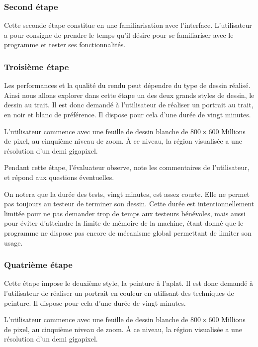 			\subsubsection{Second étape}
			Cette seconde étape constitue en une familiarisation avec l'interface. L'utilisateur
			a pour consigne de prendre le temps qu'il désire pour se familiariser avec le programme
			et tester ses fonctionnalités. 

			\subsubsection{Troisième étape}
			Les performances et la qualité du rendu peut dépendre du type de dessin réalisé. Ainsi
			nous allons explorer dans cette étape un des deux grands styles de dessin, le dessin au trait.
			Il est donc demandé à l'utilisateur de réaliser un portrait au trait, en noir et blanc de préférence.
			Il dispose pour cela d'une durée de vingt minutes. 


			L'utilisateur commence avec une feuille de dessin blanche de $800 \times 600$ Millions de pixel, au cinquième
			niveau de zoom. À ce niveau, la région visualisée a une résolution d'un demi gigapixel.

			Pendant cette étape, l'évaluateur observe, note les commentaires de l'utilisateur, et répond aux questions
			éventuelles. 

			On notera que la durée des tests, vingt minutes, est assez courte. Elle ne permet pas toujours au testeur
			de terminer son dessin. Cette durée est intentionnellement limitée pour ne pas demander trop de temps aux testeurs
			bénévoles, mais aussi pour éviter d'atteindre la limite de mémoire de la machine, étant donné que 
			le programme ne dispose pas encore de mécanisme global permettant de limiter son usage. 

			\subsubsection{Quatrième étape}
			Cette étape impose le deuxième style, la peinture à l'aplat. Il est donc demandé à l'utilisateur de
			réaliser un portrait en couleur en utilisant des techniques de peinture. 
			Il dispose pour cela d'une durée de vingt minutes. 

			L'utilisateur commence avec une feuille de dessin blanche de $800 \times 600$ Millions de pixel, au cinquième
			niveau de zoom. À ce niveau, la région visualisée a une résolution d'un demi gigapixel.

